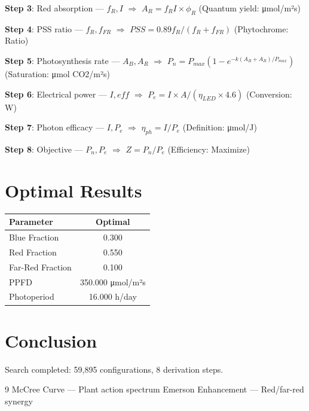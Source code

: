 \documentclass[11pt,twocolumn]{article}
\begin{document}
\textbf{Step 3}: Red absorption --- $f_R, I$ $\Rightarrow$ $A_R = f_R I \times \phi_R$ (Quantum yield: μmol/m²s)


\textbf{Step 4}: PSS ratio --- $f_R, f_{FR}$ $\Rightarrow$ $PSS = 0.89 f_R / (f_R + f_{FR})$ (Phytochrome: Ratio)


\textbf{Step 5}: Photosynthesis rate --- $A_B, A_R$ $\Rightarrow$ $P_n = P_{max} (1-e^{-k(A_B+A_R)/P_{max}})$ (Saturation: μmol CO2/m²s)


\textbf{Step 6}: Electrical power --- $I, eff$ $\Rightarrow$ $P_e = I \times A / (\eta_{LED} \times 4.6)$ (Conversion: W)


\textbf{Step 7}: Photon efficacy --- $I, P_e$ $\Rightarrow$ $\eta_{ph} = I / P_e$ (Definition: μmol/J)


\textbf{Step 8}: Objective --- $P_n, P_e$ $\Rightarrow$ $Z = P_n / P_e$ (Efficiency: Maximize)


\section{Optimal Results}
\begin{table}[h]
\centering
\begin{tabular}{@{}lc@{}}
\toprule
Parameter & Optimal \\
\midrule
Blue Fraction & 0.300  \\
Red Fraction & 0.550  \\
Far-Red Fraction & 0.100  \\
PPFD & 350.000 μmol/m²s \\
Photoperiod & 16.000 h/day \\
\bottomrule
\end{tabular}
\end{table}

\section{Conclusion}
Search completed: 59,895 configurations, 8 derivation steps.

\begin{thebibliography}{9}
 McCree Curve --- Plant action spectrum
 Emerson Enhancement --- Red/far-red synergy
\end{thebibliography}
\end{document}
